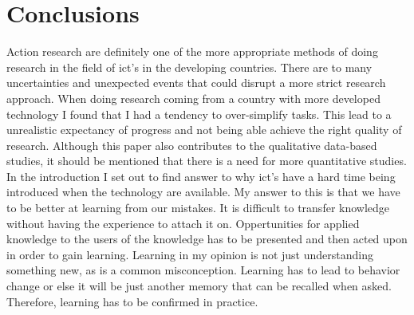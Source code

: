 \chapter{Conclusions}
Action research are definitely one of the more appropriate methods of doing research in the field of \gls{ict}'s in the developing countries. 
There are to many uncertainties and unexpected events that could disrupt a more strict research approach.
When doing research coming from a country with more developed technology I found that I had a tendency to over-simplify tasks.
This lead to a unrealistic expectancy of progress and not being able achieve the right quality of research.
Although this paper also contributes to the qualitative data-based studies, it should be mentioned that there is a need for more quantitative studies.
In the introduction I set out to find answer to why \gls{ict}'s have a hard time being introduced when the technology are available.
My answer to this is that we have to be better at learning from our mistakes.
It is difficult to transfer knowledge without having the experience to attach it on. 
Oppertunities for applied knowledge to the users of the knowledge has to be presented and then acted upon in order to gain learning.
Learning in my opinion is not just understanding something new, as is a common misconception.
Learning has to lead to behavior change or else it will be just another memory that can be recalled when asked.
Therefore, learning has to be confirmed in practice.



